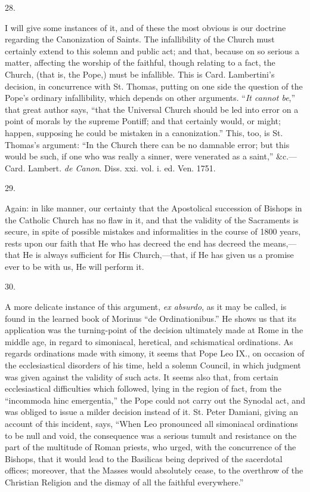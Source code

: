 28.

I will give some instances of it, and of these the most obvious is
our doctrine regarding the Canonization of Saints. The infallibility
of the Church must certainly extend to this solemn and public act; and
that, because on so serious a matter, affecting the worship of the
faithful, though relating to a fact, the Church, (that is, the Pope,)
must be infallible. This is Card. Lambertini's decision, in
concurrence with St. Thomas, putting on one side the question of the
Pope's ordinary infallibility, which depends on other arguments.
``\emph{It cannot be},'' that great author says, ``that
the Universal Church should be led into error on a point of morals by
the supreme Pontiff; and that certainly would, or might; happen,
supposing he could be mistaken in a canonization.'' This, too, is
St. Thomas's argument: ``In the Church there can be no damnable
error; but this would be such, if one who was really a sinner, were
venerated as a saint,'' \&c.—Card. Lambert. \emph{de Canon}.
Diss. xxi. vol. i. ed. Ven. 1751.

29.

Again: in like manner, our certainty that the Apostolical
succession of Bishops in the Catholic Church has no flaw in it, and
that the validity of the Sacraments is secure, in spite of possible
mistakes and informalities in the course of 1800 years, rests upon our
faith that He who has decreed the end has decreed the means,—that
He is always sufficient for His Church,—that, if He has given us a
promise ever to be with us, He will perform it.

30.

A more delicate instance of this argument, \emph{ex absurdo}, as it
may be called, is found in the learned book of Morinus ``de
Ordinationibus.'' He shows us that its application was the
turning-point of the decision ultimately made at Rome in the middle
age, in regard to simoniacal, heretical, and schismatical ordinations.
As regards ordinations made with simony, it seems that Pope Leo IX.,
on occasion of the ecclesiastical disorders of his time, held a solemn
Council, in which judgment was given against the validity of such
acts. It seems also that, from certain ecclesiastical difficulties
which followed, lying in the region of fact, from the ``incommoda
hinc emergentia,'' the Pope could not carry out the Synodal act,
and was obliged to issue a milder decision instead of it. St. Peter
Damiani, giving an account of this incident, says, ``When Leo
pronounced all simoniacal ordinations to be null and void, the
consequence was a serious tumult and resistance on the part of the
multitude of Roman priests, who urged, with the concurrence of the
Bishops, that it would lead to the Basilicas being deprived of the
sacerdotal offices; moreover, that the Masses would
absolutely cease, to the overthrow of the Christian Religion and the
dismay of all the faithful everywhere.''

